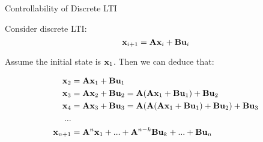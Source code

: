 \documentclass{beamer}
\begin{document}
\begin{frame}{Controllability of Discrete LTI}
\begin{flushleft}

Consider discrete LTI:
\begin{equation}
\mathbf{x}_{i+1} = \mathbf{A}  \mathbf{x}_i + \mathbf{B} \mathbf{u}_i
\end{equation}

Assume the initial state is $\mathbf{x}_1$. Then we can deduce that:

\begin{align*}
\mathbf{x}_2 &= \mathbf{A} \mathbf{x}_1 + \mathbf{B} \mathbf{u}_1 \\
\mathbf{x}_3 &= \mathbf{A} \mathbf{x}_2 + \mathbf{B} \mathbf{u}_2 = \mathbf{A} (\mathbf{A} \mathbf{x}_1 + \mathbf{B} \mathbf{u}_1) + \mathbf{B} \mathbf{u}_2 \\
\mathbf{x}_4 &= \mathbf{A} \mathbf{x}_3 + \mathbf{B} \mathbf{u}_3 = \mathbf{A} (\mathbf{A} (\mathbf{A} \mathbf{x}_1 + \mathbf{B} \mathbf{u}_1) + \mathbf{B} \mathbf{u}_2) + \mathbf{B} \mathbf{u}_3 \\
... \\
\mathbf{x}_{n+1} &= \mathbf{A}^n \mathbf{x}_1 + ... + 
\mathbf{A}^{n - k} \mathbf{B} \mathbf{u}_{k} + ... + 
\mathbf{B} \mathbf{u}_n
\end{align*}

\end{flushleft}
\end{frame}
\end{document}
